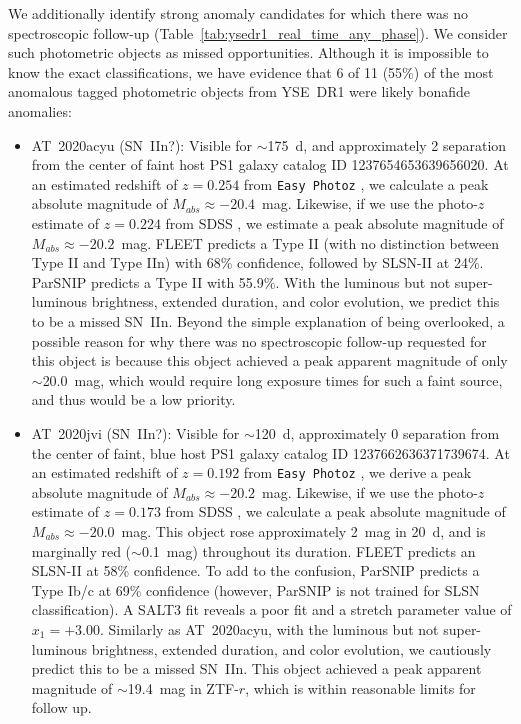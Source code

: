\documentclass[twocolumn]{aastex63}
\begin{document}
We additionally identify strong anomaly candidates for which there was no spectroscopic follow-up (Table~\ref{tab:ysedr1_real_time_any_phase}). We consider such photometric objects as missed opportunities. Although it is impossible to know the exact classifications, we have evidence that 6 of 11 (55\%) of the most anomalous tagged photometric objects from YSE~DR1 were likely bonafide anomalies: \par
\begin{itemize}
    \item AT~2020acyu (SN~IIn?): Visible for $\sim$175~d, and approximately 2 separation from the center of faint host PS1 galaxy catalog ID 1237654653639656020. At an estimated redshift of $z=0.254$ from \texttt{Easy Photoz} \citep{Aleo2023}, we calculate a peak absolute magnitude of $M_{abs}\approx-20.4$~mag. Likewise, if we use the photo-$z$ estimate of $z=0.224$ from SDSS \citep{Csabai2003}, we estimate a peak absolute magnitude of $M_{abs}\approx-20.2$~mag. FLEET \citep{Gomez2020} predicts a Type II (with no distinction between Type II and Type IIn) with 68\% confidence, followed by SLSN-II at 24\%. ParSNIP predicts a Type II with 55.9\%. With the luminous but not super-luminous brightness, extended duration, and color evolution, we predict this to be a missed SN~IIn. Beyond the simple explanation of being overlooked, a possible reason for why there was no spectroscopic follow-up requested for this object is because this object achieved a peak apparent magnitude of only $\sim$20.0~mag, which would require long exposure times for such a faint source, and thus would be a low priority. 
    \item AT~2020jvi (SN~IIn?): Visible for $\sim$120~d, approximately 0 separation from the center of faint, blue host PS1 galaxy catalog ID 1237662636371739674. At an estimated redshift of $z=0.192$ from \texttt{Easy Photoz} \citep{Aleo2023}, we derive a peak absolute magnitude of $M_{abs}\approx-20.2$~mag. Likewise, if we use the photo-$z$ estimate of $z=0.173$ from SDSS \citep{Csabai2003}, we calculate a peak absolute magnitude of $M_{abs}\approx-20.0$~mag. This object rose approximately 2~mag in 20~d, and is marginally red ($\sim$0.1~mag) throughout its duration. FLEET \citep{Gomez2020} predicts an SLSN-II at 58\% confidence. To add to the confusion, ParSNIP predicts a Type Ib/c at 69\% confidence (however, ParSNIP is not trained for SLSN classification). A SALT3 fit reveals a poor fit and a stretch parameter value of $x_1=+3.00$. Similarly as AT~2020acyu, with the luminous but not super-luminous brightness, extended duration, and color evolution, we cautiously predict this to be a missed SN~IIn. This object achieved a peak apparent magnitude of $\sim$19.4~mag in ZTF-$r$, which is within reasonable limits for follow up. 

\end{itemize}
\end{document}
